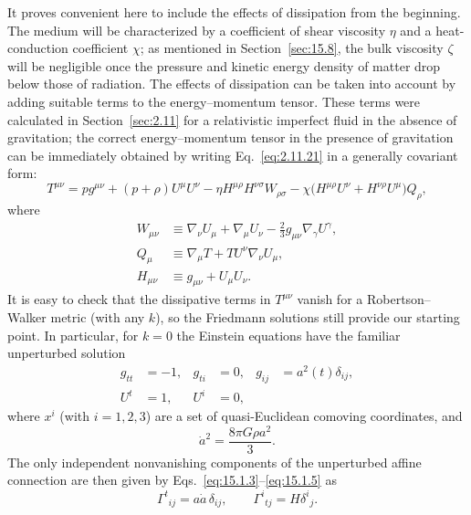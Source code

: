 It proves convenient here to include the effects of dissipation from the
beginning. The medium will be characterized by a coefficient of shear
viscosity \(\eta\) and a heat-conduction coefficient \(\chi\); as mentioned
in Section~\ref{sec:15.8}, the bulk viscosity \(\zeta\) will be negligible
once the pressure and kinetic energy density of matter drop below those of
radiation. The effects of dissipation can be taken into account by adding
suitable terms to the energy--momentum tensor. These terms were calculated in
Section~\ref{sec:2.11} for a relativistic imperfect fluid in the absence of
gravitation; the correct energy--momentum tensor in the presence of gravitation
can be immediately obtained by writing Eq.~\eqref{eq:2.11.21} in a generally
covariant form:
\begin{equation}
  T^{\mu\nu}
  =
  pg^{\mu\nu}
  +(p+\rho)U^\mu U^\nu
  -\eta H^{\mu\rho}H^{\nu\sigma}W_{\rho\sigma}
  -\chi\bigl(H^{\mu\rho}U^\nu+H^{\nu\rho}U^\mu\bigr)Q_\rho,
  \tag{15.10.1}\label{eq:15.10.1}
\end{equation}
where
\begin{align}
  W_{\mu\nu}
  &\equiv
  \nabla_\nu U_\mu+\nabla_\mu U_\nu
  -\frac23g_{\mu\nu}\nabla_\gamma U^\gamma,
  \tag{15.10.2}\label{eq:15.10.2}\\
  Q_\mu
  &\equiv
  \nabla_\mu T+T U^\nu\nabla_\nu U_\mu,
  \tag{15.10.3}\label{eq:15.10.3}\\
  H_{\mu\nu}
  &\equiv
  g_{\mu\nu}+U_\mu U_\nu.
  \tag{15.10.4}\label{eq:15.10.4}
\end{align}
It is easy to check that the dissipative terms in \(T^{\mu\nu}\) vanish for
a Robertson--Walker metric (with any \(k\)), so the Friedmann solutions still
provide our starting point. In particular, for \(k=0\) the Einstein equations
have the familiar unperturbed solution
\begin{align}
  g_{tt}&=-1,
  &g_{ti}&=0,
  &g_{ij}&=a^2(t)\delta_{ij},
  \tag{15.10.5}\label{eq:15.10.5}\\
  U^t&=1,
  &U^i&=0,
  \tag{15.10.6}\label{eq:15.10.6}
\end{align}
where \(x^i\) (with \(i=1,2,3\)) are a set of quasi-Euclidean comoving
coordinates, and
\begin{equation}
  \dot a^2=\frac{8\pi G\rho a^2}{3}.
  \tag{15.10.7}\label{eq:15.10.7}
\end{equation}
The only independent nonvanishing components of the unperturbed affine
connection are then given by Eqs.~\eqref{eq:15.1.3}--\eqref{eq:15.1.5} as
\begin{equation}
  \Gamma^t{}_{ij}=a\dot a\,\delta_{ij},
  \qquad
  \Gamma^i{}_{tj}=H\delta^i{}_j.
  \tag{15.10.8}\label{eq:15.10.8}
\end{equation}

